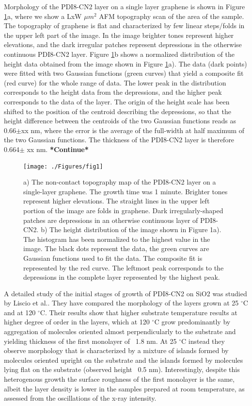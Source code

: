 \documentclass[preprint,aip,jap]{revtex4-2}
\begin{document}
Morphology of the PDI8-CN2 layer on a single layer graphene is shown in Figure \ref{fig:1}a, where we show a LxW $\mu m^2$ AFM topography scan of the area of the sample. The topography of graphene is flat and characterized by few linear steps/folds in the upper left part of the image. In the image brighter tones represent higher elevations, and the dark irregular patches represent depressions in the otherwise continuous PDI8-CN2 layer. Figure \ref{fig:1}b  shows a normalized distribution of the height data obtained from the image shown in Figure \ref{fig:1}a). The data (dark points) were fitted with two Gaussian functions (green curves) that yield a composite fit (red curve) for the whole range of data. The lower peak in the distribution corresponds to the height data from the depressions, and the higher peak corresponds to the data of the layer. The origin of the height scale has been shifted to the position of the centroid describing the depressions, so that the height difference between the centroids of the two Gaussian functions reads as 0.66$\pm$xx nm, where the error is the average of the full-width at half maximum of the two Gaussian functions.  The thickness of the PDI8-CN2 layer is therefore 0.664$\pm$ xx nm.\textbf{ *Continue*}
\begin{figure}[htb]
  \centering
        \texttt{[image: ./Figures/fig1]}
  \caption{a) The non-contact topography map of the PDI8-CN2 layer on a single-layer graphene. The growth time was 1 minute. Brighter tones represent higher elevations. The straight lines in the upper left portion of the image are folds in graphene. Dark irregularly-shaped patches are depressions in an otherwise continuous layer of PDI8-CN2.  b) The height distribution of the image shown in Figure 1a). The histogram has been normalized to the highest value in the image. The black dots represent the data, the green curves are Gaussian functions used to fit the data. The composite fit is represented by the red curve. The leftmost peak corresponds to the depressions in the complete layer represented by the highest peak.}
  \label{fig:1}
\end{figure}

 
A detailed study of the initial stages of growth of PDI8-CN2 on SiO2 was studied by Liscio et al.\cite{liscio-2013}. They have compared the morphology of the layers grown at 25 $^\circ$C and at 120 $^\circ$C. Their results show that higher substrate temperature results at higher degree of order in the layers, which at 120 $^\circ$C grow predominantly by aggregation of molecules oriented almost perpendicularly to the substrate and yielding thickness of the first monolayer of ~1.8 nm. At 25 $^\circ$C instead they observe morphology that is characterized by a mixture of islands formed by molecules oriented upright on the substrate and the islands formed by molecules lying flat on the substrate (observed height ~0.5 nm). Interestingly, despite this heterogenous growth the surface roughness of the first monolayer is the same, albeit the layer density is lower in the samples prepared at room temperature, as assessed from the oscillations of the x-ray intensity. 
\end{document}
